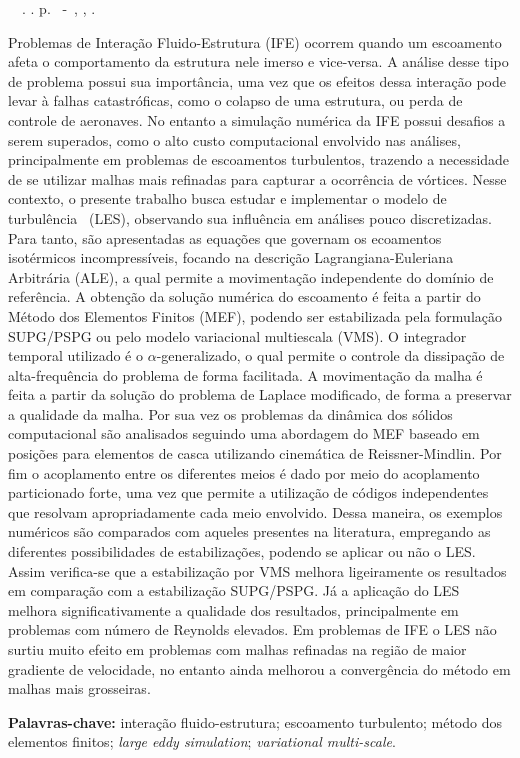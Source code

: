 \setlength{\absparsep}{18pt} %
\begin{resumo}
	\begin{flushleft}
		\setlength{\absparsep}{0pt} %
		\SingleSpacing
		\imprimirautorabr~~\textbf{\imprimirtituloresumo}.	\imprimirdata. \pageref{LastPage} p.
		\imprimirtipotrabalho~-~\imprimirinstituicao, \imprimirlocal, \imprimirdata.
	\end{flushleft}
	\OnehalfSpacing

	Problemas de Interação Fluido-Estrutura (IFE) ocorrem quando um escoamento afeta o comportamento da estrutura nele imerso e vice-versa. A análise desse tipo de problema possui sua importância, uma vez que os efeitos dessa interação pode levar à falhas catastróficas, como o colapso de uma estrutura, ou perda de controle de aeronaves. No entanto a simulação numérica da IFE possui desafios a serem superados, como o alto custo computacional envolvido nas análises, principalmente em problemas de escoamentos turbulentos, trazendo a necessidade de se utilizar malhas mais refinadas para capturar a ocorrência de vórtices. Nesse contexto, o presente trabalho busca estudar e implementar o modelo de turbulência \LES\ (LES), observando sua influência em análises pouco discretizadas. Para tanto, são apresentadas as equações que governam os ecoamentos isotérmicos incompressíveis, focando na descrição Lagrangiana-Euleriana Arbitrária (ALE), a qual permite a movimentação independente do domínio de referência. A obtenção da solução numérica do escoamento é feita a partir do Método dos Elementos Finitos (MEF), podendo ser estabilizada pela formulação SUPG/PSPG ou pelo modelo variacional multiescala (VMS). O integrador temporal utilizado é o $\alpha$-generalizado, o qual permite o controle da dissipação de alta-frequência do problema de forma facilitada. A movimentação da malha é feita a partir da solução do problema de Laplace modificado, de forma a preservar a qualidade da malha. Por sua vez os problemas da dinâmica dos sólidos computacional são analisados seguindo uma abordagem do MEF baseado em posições para elementos de casca utilizando cinemática de Reissner-Mindlin. Por fim o acoplamento entre os diferentes meios é dado por meio do acoplamento particionado forte, uma vez que permite a utilização de códigos independentes que resolvam apropriadamente cada meio envolvido. Dessa maneira, os exemplos numéricos são comparados com aqueles presentes na literatura, empregando as diferentes possibilidades de estabilizações, podendo se aplicar ou não o LES. Assim verifica-se que a estabilização por VMS melhora ligeiramente os resultados em comparação com a estabilização SUPG/PSPG. Já a aplicação do LES melhora significativamente a qualidade dos resultados, principalmente em problemas com número de Reynolds elevados. Em problemas de IFE o LES não surtiu muito efeito em problemas com malhas refinadas na região de maior gradiente de velocidade, no entanto ainda melhorou a convergência do método em malhas mais grosseiras.

	\textbf{Palavras-chave:} interação fluido-estrutura; escoamento turbulento; método dos elementos finitos; \textit{large eddy simulation}; \textit{variational multi-scale}.
\end{resumo}
